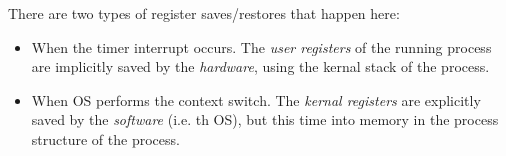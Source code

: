 There are two types of register saves/restores that happen here:

\begin{itemize}
    \item When the timer interrupt occurs. The \textit{user registers} of the
        running process are implicitly saved by the \textit{hardware}, using
        the kernal stack of the process.
    \item When OS performs the context switch. The \textit{kernal registers} 
        are explicitly saved by the \textit{software} (i.e. th OS), but this
        time into memory in the process structure of the process.
\end{itemize}


